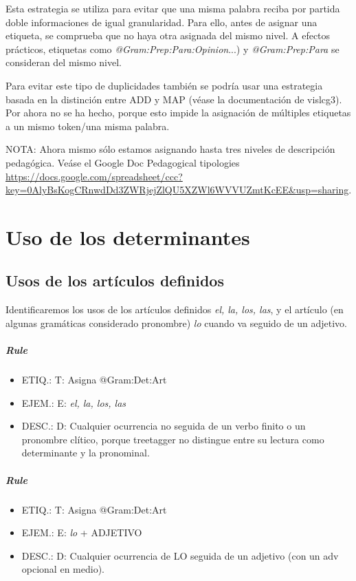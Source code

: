 \documentclass[11pt]{report}
\begin{document}
Esta estrategia se utiliza para evitar que una misma palabra reciba por partida doble informaciones de igual granularidad. Para ello, antes de asignar una etiqueta, se comprueba que no haya otra asignada del mismo nivel. A efectos prácticos, etiquetas como \emph{@Gram:Prep:Para:Opinion}...) y \emph{@Gram:Prep:Para} se consideran del mismo nivel.

Para evitar este tipo de duplicidades también se podría usar una estrategia basada en la distinción entre ADD y MAP (véase la documentación de vislcg3). Por ahora no se ha hecho, porque esto impide la asignación de múltiples etiquetas a un mismo token/una misma palabra.

NOTA: Ahora mismo sólo estamos asignando hasta tres niveles de descripción pedagógica. Veáse el Google Doc Pedagogical tipologies \url{https://docs.google.com/spreadsheet/ccc?key=0AlyBsKogCRnwdDd3ZWRjejZlQU5XZWl6WVVUZmtKcEE&usp=sharing}.

\chapter{Uso de los determinantes}
\section{Usos de los artículos definidos}
Identificaremos los usos de los artículos definidos \emph{el, la, los, las}, y el artículo (en algunas gramáticas considerado pronombre) \emph{lo} cuando va seguido de un adjetivo.

\paragraph*{Rule}
\begin{itemize}
\item ETIQ.:  T: Asigna @Gram:Det:Art
\item EJEM.:  E: \emph{el, la, los, las}
\item DESC.:  D: Cualquier ocurrencia no seguida de un verbo finito o un pronombre clítico, porque treetagger no distingue entre su lectura como determinante y la pronominal.
\end{itemize}

\paragraph*{Rule}
\begin{itemize}
\item ETIQ.:  T: Asigna @Gram:Det:Art
\item EJEM.:  E: \emph{lo} + ADJETIVO
\item DESC.:  D: Cualquier ocurrencia de LO seguida de un adjetivo (con un adv opcional en medio).
\end{itemize}
\end{document}
